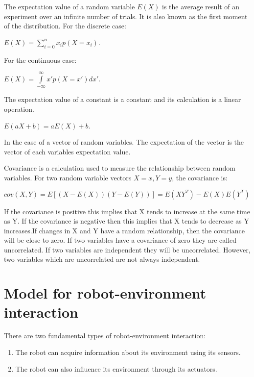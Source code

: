 \documentclass[twoside]{article}
\begin{document}
The expectation value of a random variable $E(X)$ is the average result of an experiment over an infinite number of trials. It is also known as the first moment of the distribution. For the discrete case:

\begin{center}
$E(X)= \sum\limits_{i = 0}^{n} x_ip(X=x_i)$.
\end{center}

For the continuous case:

\begin{center}
$E(X)= \int\limits_{-\infty}^{\infty}  x'p(X=x')dx'$.
\end{center}

The expectation value of a constant is a constant and its calculation is a linear operation.

\begin{center}
$E(aX + b)= aE(X) + b$.
\end{center}

In the case of a vector of random variables. The expectation of the vector is the vector of each variables expectation value.

Covariance is a calculation used to measure the relationship between random variables. For two random variable vectors $X=x, Y=y$, the covariance is:

\begin{center}
$cov(X,Y)=E[(X-E(X))(Y-E(Y))] = E(XY^T) - E(X)E(Y^T)$
\end{center}

If the covariance is positive this implies that X tends to increase at the same time as Y. If the covariance is negative then this implies that X tends to decrease as Y increases.If changes in X and Y have a random relationship, then the covariance will be close to zero. If two variables have a covariance of zero they are called uncorrelated. If two variables are independent they will be uncorrelated. However, two variables which are uncorrelated are not always independent.

\section{Model for robot-environment interaction\cite{Thrun}}
There are two fundamental types of robot-environment interaction:
\begin{enumerate}
  \item The robot can acquire information about its environment using its sensors.

  \item The robot can also influence its environment through its actuators.
\end{enumerate}
\end{document}

